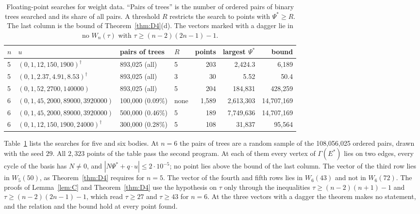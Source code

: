 \documentclass[11pt]{amsart}
\theoremstyle{definition}
\theoremstyle{remark}
\numberwithin{equation}{section}
\newcommand{\Ps}{\Psi^{*}}
\newcommand{\Es}{E^{*}}
\begin{document}
\begin{table}[ht]
\caption{Floating-point searches for weight data. ``Pairs of trees'' is the number of ordered pairs
of binary trees searched and its share of all pairs. A threshold $R$ restricts the search to points
with $\Ps \ge R$. The last column is the bound of Theorem~\ref{thm:D4}(d). The vectors marked
with a dagger lie in no $W_n(\tau)$ with $\tau \ge (n - 2)(2n - 1) - 1$.}\label{tab:comp}
\footnotesize
\setlength{\tabcolsep}{4pt}
\begin{tabular}{@{}l>{\raggedright}p{}>{\raggedright}p{}lrrr@{}}
\toprule
$n$ & $u$ & pairs of trees & $R$ & points & largest $\Ps$ & bound \\
\midrule
5 & $(0, 1, 12, 150, 1900)^{\dagger}$ & 893,025 (all) & 5 & 203 & 2,424.3 & 6,189 \\
5 & $(0, 1, 2.37, 4.91, 8.53)^{\dagger}$ & 893,025 (all) & 3 & 30 & 5.52 & 50.4 \\
5 & $(0, 1, 52, 2700, 140000)$ & 893,025 (all) & 5 & 204 & 184,831 & 428,259 \\
6 & $(0, 1, 45, 2000, 89000, 3920000)$ & 100,000 (0.09\%) & none & 1,589 & 2,613,303 & 14,707,169 \\
6 & $(0, 1, 45, 2000, 89000, 3920000)$ & 500,000 (0.46\%) & 5 & 189 & 7,749,636 & 14,707,169 \\
6 & $(0, 1, 12, 150, 1900, 24000)^{\dagger}$ & 300,000 (0.28\%) & 5 & 108 & 31,837 & 95,564 \\
\bottomrule
\end{tabular}
\end{table}

Table~\ref{tab:comp} lists the searches for five and six bodies. At $n = 6$ the pairs of trees are a
random sample of the 108,056,025 ordered pairs, drawn with the seed $29$. All $2{,}323$ points of the
table pass the second program. At each of them every vertex of $\Gamma(\Es)$ lies on two edges, every
cycle of the basis has $N \ne 0$, and $|N\Ps + q \cdot u| \le 2 \cdot 10^{-5}$; no point lies above the
bound of the last column. The vector of the third row lies in $W_5(50)$, as Theorem~\ref{thm:D4} requires for $n = 5$.
The vector of the fourth and fifth rows lies in $W_6(43)$ and not in $W_6(72)$. The proofs of
Lemma~\ref{lem:C} and Theorem~\ref{thm:D4} use the hypothesis on $\tau$ only through the inequalities
$\tau \ge (n - 2)(n + 1) - 1$ and $\tau \ge (n - 2)(2n - 1) - 1$, which read $\tau \ge 27$ and
$\tau \ge 43$ for $n = 6$. At the three vectors with a dagger the theorem makes no statement, and the
relation and the bound hold at every point found.
\end{document}
